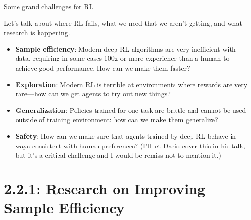 \documentclass[9pt]{beamer}
\begin{document}
\begin{frame}{Some grand challenges for RL}

Let's talk about where RL fails, what we need that we aren't getting, and what research is happening.

\begin{itemize}
\item \textbf{Sample efficiency}: Modern deep RL algorithms are very inefficient with data, requiring in some cases 100x or more experience than a human to achieve good performance. How can we make them faster?
\pause
\item \textbf{Exploration}: Modern RL is terrible at environments where rewards are very rare---how can we get agents to try out new things?
\pause
\item \textbf{Generalization}: Policies trained for one task are brittle and cannot be used outside of training environment: how can we make them generalize?
\pause
\item \textbf{Safety}: How can we make sure that agents trained by deep RL behave in ways consistent with human preferences? {\color{red} (I'll let Dario cover this in his talk, but it's a critical challenge and I would be remiss not to mention it.)}
\end{itemize}

\end{frame}

\section{2.2.1: Research on Improving Sample Efficiency}
\end{document}
